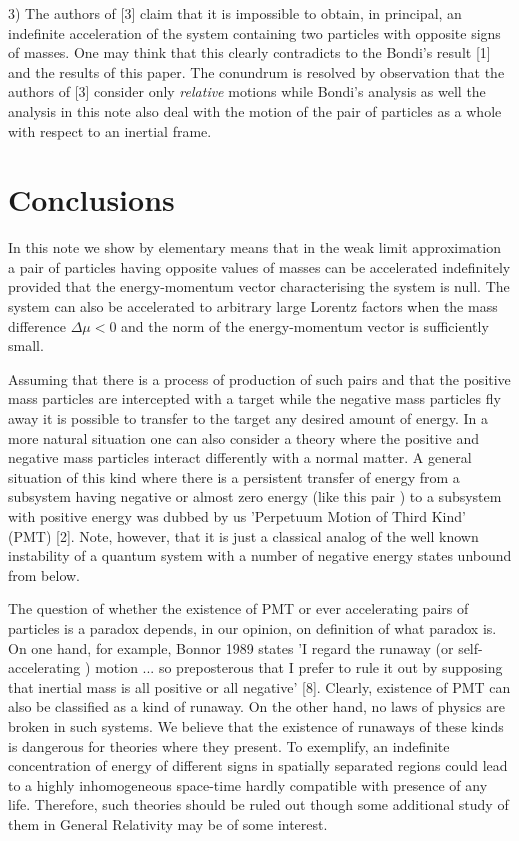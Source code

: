 \documentclass[aip,nofootinbib]{revtex4}
\begin{document}
3) The authors of [3] claim that it is impossible to obtain, in
principal, an indefinite acceleration of the system containing two
particles with opposite signs of masses. One may think that this
clearly contradicts to the Bondi's result [1] and the results of
this paper. The conundrum is resolved by observation that the
authors of [3] consider only {\it relative} motions while Bondi's
analysis as well the analysis in this note also deal with the
motion of the pair of particles as a whole with respect to an
inertial frame.


\section{Conclusions}
In this note we show by elementary means that in the weak limit
approximation a pair of particles having opposite values of masses
can be accelerated indefinitely provided that  the energy-momentum
vector characterising the system is null. The system can also be
accelerated to arbitrary large Lorentz factors when the mass
difference $\Delta \mu < 0$ and the norm of the energy-momentum
vector is sufficiently small.

Assuming that there is a process of production of such pairs and
that the positive mass particles are intercepted with a target
while the negative mass particles fly away it is possible to
transfer to the target any desired amount of energy. In a more
natural situation one can also consider a theory where the
positive and negative mass particles interact differently with a
normal matter. A general situation of this kind where there is a
persistent transfer of energy from a subsystem having negative or
almost zero energy (like this pair ) to a subsystem with positive
energy was dubbed by us 'Perpetuum Motion of Third Kind' (PMT)
[2]. Note, however, that it is just a classical analog of the well
known instability of a quantum system with a number of negative
energy states unbound from below.

The question of whether the existence of PMT or ever accelerating
pairs of particles is a paradox depends, in our opinion, on
definition of what paradox is. On one hand, for example, Bonnor
1989 states 'I regard the runaway (or self-accelerating ) motion
... so preposterous that I prefer to rule it out by supposing that
inertial mass is all positive or all negative' [8]. Clearly,
existence of PMT can also be classified as a kind of runaway. On
the other hand, no laws of physics are broken in such systems. We
believe that the existence of runaways of these kinds is dangerous
for theories where they present. To exemplify, an indefinite
concentration of energy of different signs in spatially separated
regions could lead to a highly inhomogeneous space-time hardly
compatible with presence of any life. Therefore, such theories
should be ruled out though some additional study of them in
General Relativity may be of some interest.
\end{document}
